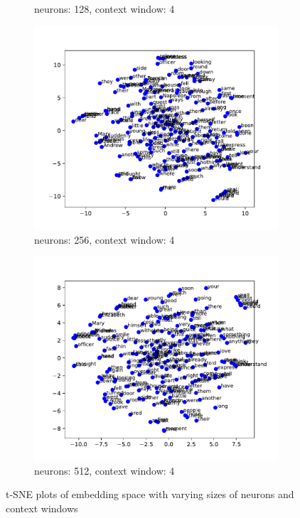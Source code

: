 \documentclass[12pt]{article} \usepackage{COSC420style} \usepackage{soul}
\begin{document}
\begin{figure}[htbp]
\begin{subfigure}[b]{0.45\textwidth}
		\caption{neurons: 128, context window: 4}
		\label{fig:128_4}
	\end{subfigure}
	\newline %
	\begin{subfigure}[b]{0.45\textwidth}
		\includegraphics[width=\textwidth]{./figures/dim_256_ctx_4_embedding.pdf}
		\caption{neurons: 256, context window: 4}
		\label{fig:256_4}
	\end{subfigure}
	\hfill %
	\begin{subfigure}[b]{0.45\textwidth}
		\includegraphics[width=\textwidth]{./figures/dim_512_ctx_4_embedding.pdf}
		\caption{neurons: 512, context window: 4}
		\label{fig:512_4}
	\end{subfigure}
	\caption{t-SNE plots of embedding space with varying sizes of neurons and context windows}
	\label{fig:larger_embeddings}
\end{figure}
\end{document}
